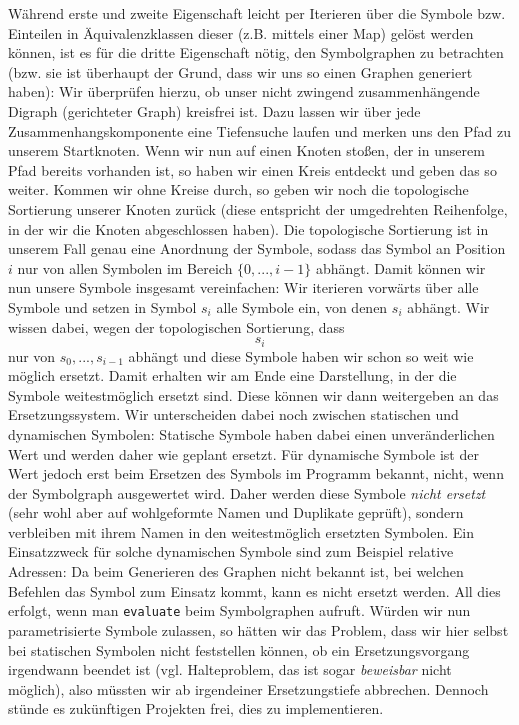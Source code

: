 Während erste und zweite Eigenschaft leicht per Iterieren über die Symbole bzw.
Einteilen in Äquivalenzklassen dieser (z.B. mittels einer Map) gelöst werden
können, ist es für die dritte Eigenschaft nötig, den Symbolgraphen zu betrachten
(bzw. sie ist überhaupt der Grund, dass wir uns so einen Graphen generiert
haben): Wir überprüfen hierzu, ob unser nicht zwingend zusammenhängende Digraph
(gerichteter Graph) kreisfrei ist. Dazu lassen wir über jede
Zusammenhangskomponente eine Tiefensuche laufen und merken uns den Pfad zu
unserem Startknoten. Wenn wir nun auf einen Knoten stoßen, der in unserem Pfad
bereits vorhanden ist, so haben wir einen Kreis entdeckt und geben das so weiter. Kommen wir ohne
Kreise durch, so geben wir noch die topologische Sortierung unserer Knoten
zurück (diese entspricht der umgedrehten Reihenfolge, in der wir die Knoten
abgeschlossen haben). Die topologische Sortierung ist in unserem Fall genau eine
Anordnung der Symbole, sodass das Symbol an Position $i$ nur von allen
Symbolen im Bereich $\{0,...,i-1\}$ abhängt. Damit können wir nun unsere
Symbole insgesamt vereinfachen: Wir iterieren vorwärts über alle Symbole und
setzen in Symbol $s_i$ alle Symbole ein, von denen $s_i$ abhängt. Wir wissen
dabei, wegen der topologischen Sortierung, dass $$s_i$$ nur von
$s_0,...,s_{i-1}$ abhängt und diese Symbole haben wir schon so weit wie möglich
ersetzt. Damit erhalten wir am Ende eine Darstellung, in der die Symbole
weitestmöglich ersetzt sind. Diese können wir dann weitergeben an das
Ersetzungssystem. Wir unterscheiden dabei noch zwischen statischen und
dynamischen Symbolen: Statische Symbole haben dabei einen unveränderlichen Wert
und werden daher wie geplant ersetzt. Für dynamische Symbole ist der Wert jedoch
erst beim Ersetzen des Symbols im Programm bekannt, nicht, wenn der
Symbolgraph ausgewertet wird. Daher werden diese Symbole \emph{nicht ersetzt}
(sehr wohl aber auf wohlgeformte Namen und Duplikate geprüft), sondern verbleiben
mit ihrem Namen in den weitestmöglich ersetzten Symbolen. Ein Einsatzzweck für
solche dynamischen Symbole sind zum Beispiel relative Adressen: Da beim
Generieren des Graphen nicht bekannt ist, bei welchen Befehlen das Symbol zum
Einsatz kommt, kann es nicht ersetzt werden. All dies erfolgt, wenn man
\texttt{evaluate} beim Symbolgraphen aufruft. Würden wir nun parametrisierte
Symbole zulassen, so hätten wir das Problem, dass wir hier selbst bei statischen
Symbolen nicht feststellen können, ob ein Ersetzungsvorgang irgendwann beendet
ist (vgl. Halteproblem, das ist sogar \emph{beweisbar} nicht möglich), also
müssten wir ab irgendeiner Ersetzungstiefe abbrechen. Dennoch stünde es
zukünftigen Projekten frei, dies zu implementieren.

